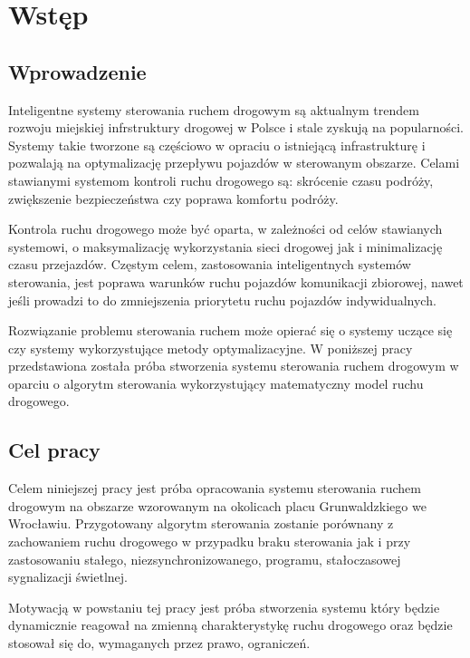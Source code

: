 \chapter{Wstęp}
\section{Wprowadzenie}
Inteligentne systemy sterowania ruchem drogowym są aktualnym trendem rozwoju miejskiej infrstruktury drogowej w Polsce i stale zyskują na popularności.
Systemy takie tworzone są częściowo w opraciu o istniejącą infrastrukturę i pozwalają na optymalizację przepływu pojazdów w sterowanym obszarze.
Celami stawianymi systemom kontroli ruchu drogowego są: skrócenie czasu podróży, zwiększenie bezpieczeństwa czy poprawa komfortu podróży.

Kontrola ruchu drogowego może być oparta, w zależności od celów stawianych systemowi, o maksymalizację wykorzystania sieci drogowej jak i minimalizację czasu przejazdów. Częstym celem, zastosowania inteligentnych systemów sterowania, jest poprawa warunków ruchu pojazdów komunikacji zbiorowej, nawet jeśli prowadzi to do zmniejszenia priorytetu ruchu pojazdów indywidualnych.

Rozwiązanie problemu sterowania ruchem może opierać się o systemy uczące się czy systemy wykorzystujące metody optymalizacyjne. W poniższej pracy przedstawiona została próba stworzenia systemu sterowania ruchem drogowym w oparciu o algorytm sterowania wykorzystujący matematyczny model ruchu drogowego.

\section{Cel pracy}
Celem niniejszej pracy jest próba opracowania systemu sterowania ruchem drogowym na obszarze wzorowanym na okolicach placu Grunwaldzkiego we Wrocławiu. Przygotowany algorytm sterowania zostanie porównany z zachowaniem ruchu drogowego w przypadku braku sterowania jak i przy zastosowaniu stałego, niezsynchronizowanego, programu, stałoczasowej sygnalizacji świetlnej.

Motywacją w powstaniu tej pracy jest próba stworzenia systemu który będzie dynamicznie reagował na zmienną charakterystykę ruchu drogowego oraz będzie stosował się do, wymaganych przez prawo, ograniczeń.
